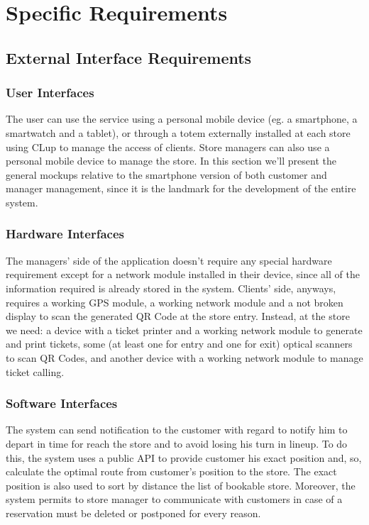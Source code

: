 \documentclass{article}
\begin{document}
\section{Specific Requirements}

	\subsection{External Interface Requirements}
	
		\subsubsection{User Interfaces}
		
			The user can use the service using a personal mobile device (eg. a smartphone, a smartwatch and a tablet), or through a totem externally installed at each store using CLup to manage the access of clients. Store managers can also use a personal mobile device to manage the store. In this section we’ll present the general mockups relative to the smartphone version of both customer and manager management, since it is the landmark for the development of the entire system.
		
		\subsubsection{Hardware Interfaces}
		
			The managers’ side of the application doesn’t require any special hardware requirement except for a network module installed in their device, since all of the information required is already stored in the system. Clients’ side, anyways, requires a working GPS module, a working network module and a not broken display to scan the generated QR Code at the store entry. Instead, at the store we need: a device with a ticket printer and a working network module to generate and print tickets, some (at least one for entry and one for exit) optical scanners to scan QR Codes, and another device with a working network module to manage ticket calling.
			
			
		\subsubsection{Software Interfaces}
		
			The system can send notification to the customer with regard to notify him to depart in time for reach the store and to avoid losing his turn in lineup. To do this, the system uses a public API to provide customer his exact position and, so, calculate the optimal route from customer's position to the store. The exact position is also used to sort by distance the list of bookable store. Moreover, the system permits to store manager to communicate with customers in case of a reservation must be deleted or postponed for every reason.
			
\end{document}
